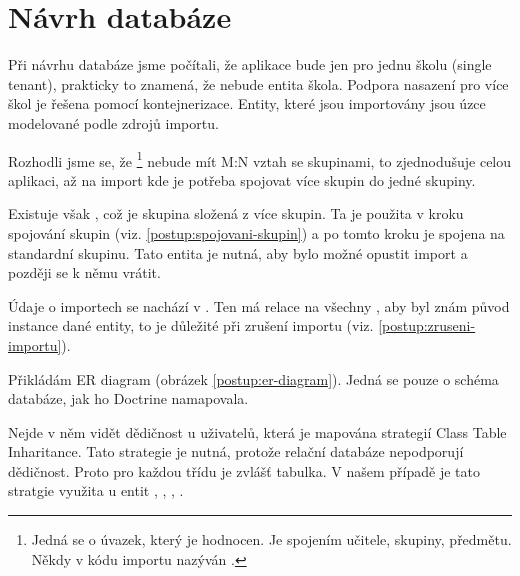 \section{Návrh databáze}

Při návrhu databáze jsme počítali, že aplikace bude jen pro jednu školu (single tenant), prakticky to znamená, že nebude entita škola. 
  Podpora nasazení pro více škol je řešena pomocí kontejnerizace.
Entity, které jsou importovány jsou úzce modelované podle zdrojů importu.

Rozhodli jsme se, že \footnote{Jedná se o úvazek, který je hodnocen. Je spojením učitele, skupiny, předmětu. Někdy v kódu importu nazýván .} 
nebude mít M:N vztah se skupinami, to zjednodušuje celou aplikaci, až na import kde je potřeba spojovat více skupin do jedné skupiny.

Existuje však , což je skupina složená z více skupin. Ta je použita v kroku spojování skupin (viz. \ref{postup:spojovani-skupin}) a po tomto kroku je spojena na standardní skupinu.
Tato entita je nutná, aby bylo možné opustit import a později se k němu vrátit.

Údaje o importech se nachází v . Ten má relace na všechny , aby byl znám původ instance dané entity, to je důležité při zrušení importu (viz. \ref{postup:zruseni-importu}).

Přikládám ER diagram (obrázek \ref{postup:er-diagram}). Jedná se pouze o schéma databáze, jak ho Doctrine namapovala.

Nejde v něm vidět dědičnost u uživatelů, která je mapována strategií Class Table Inharitance. Tato strategie je nutná, protože relační databáze nepodporují dědičnost. Proto pro každou třídu je zvlášť tabulka.\cite{P-of-EAA}
V našem případě je tato stratgie využita u entit , , , . 


%
%
%




